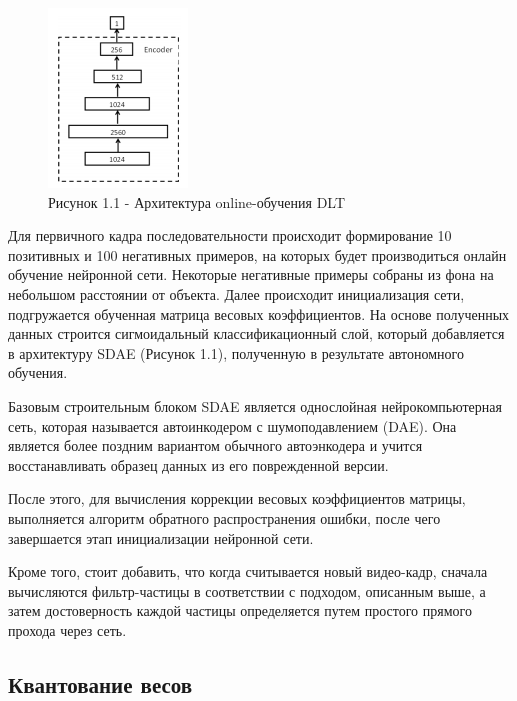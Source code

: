 \begin{figure}[h!]\label{arh}
    \centering
    \includegraphics[width = 6 cm]{tests/img/online.PNG}
    \caption*{Рисунок 1.1 - Архитектура online-обучения DLT}
\end{figure}

Для первичного кадра последовательности происходит формирование 10 позитивных и 100 негативных примеров, на которых будет производиться онлайн обучение нейронной сети. Некоторые негативные примеры собраны из фона на небольшом расстоянии от объекта. Далее происходит инициализация сети, подгружается обученная матрица весовых коэффициентов. На основе полученных данных строится сигмоидальный классификационный слой, который добавляется в архитектуру SDAE (Рисунок 1.1), полученную в результате автономного обучения.

Базовым строительным блоком SDAE является однослойная нейрокомпьютерная сеть, которая называется автоинкодером с шумоподавлением (DAE). Она является более поздним вариантом обычного автоэнкодера и учится восстанавливать образец данных из его поврежденной версии. 

После этого, для вычисления коррекции весовых коэффициентов матрицы, выполняется алгоритм обратного распространения ошибки, после чего завершается этап инициализации нейронной сети.

Кроме того, стоит добавить, что когда считывается новый видео-кадр, сначала вычисляются фильтр-частицы в соответствии с подходом, описанным выше, а затем достоверность каждой частицы определяется путем простого прямого прохода через сеть. 

\subsection{Квантование весов}

